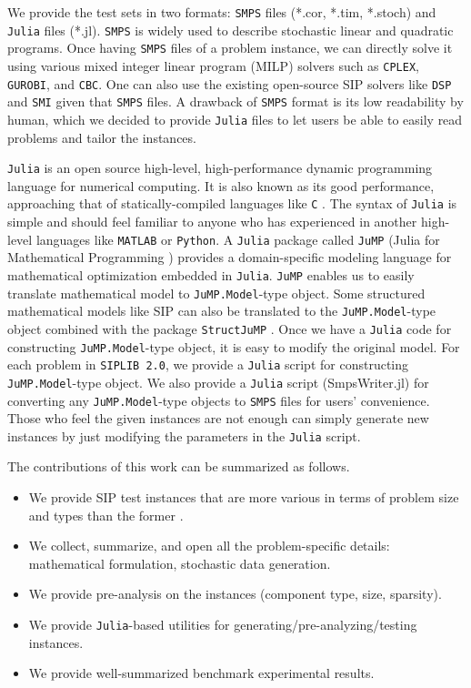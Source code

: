 We provide the test sets in two formats: \texttt{SMPS} files (*.cor, *.tim, *.stoch) and \texttt{Julia} files (*.jl). \texttt{SMPS} is widely used to describe stochastic linear and quadratic programs. Once having \texttt{SMPS} files of a problem instance, we can directly solve it using various mixed integer linear program (MILP) solvers such as \texttt{CPLEX}, \texttt{GUROBI}, and \texttt{CBC}. One can also use the existing open-source SIP solvers like \texttt{DSP} \cite{journal:KZ2015} and \texttt{SMI} \cite{web:SMI} given that \texttt{SMPS} files. A drawback of \texttt{SMPS} format is its low readability by human, which we decided to provide \texttt{Julia} files to let users be able to easily read problems and tailor the instances.

\texttt{Julia} is an open source high-level, high-performance dynamic programming language for numerical computing. It is also known as its good performance, approaching that of statically-compiled languages like \texttt{C} \cite{journal:BEKS2017}. The syntax of \texttt{Julia} is simple and should feel familiar to anyone who has experienced in another high-level languages like \texttt{MATLAB} or \texttt{Python}. A \texttt{Julia} package called \texttt{JuMP} (Julia for Mathematical Programming \cite{web:JuMP}) provides a domain-specific modeling language for mathematical optimization embedded in \texttt{Julia}. \texttt{JuMP} enables us to easily translate mathematical model to \texttt{JuMP.Model}-type object. Some structured mathematical models like SIP can also be translated to the \texttt{JuMP.Model}-type object combined with the package \texttt{StructJuMP} \cite{web:StructJuMP}. Once we have a \texttt{Julia} code for constructing \texttt{JuMP.Model}-type object, it is easy to modify the original model. For each problem in \texttt{SIPLIB 2.0}, we provide a \texttt{Julia} script for constructing \texttt{JuMP.Model}-type object. We also provide a \texttt{Julia} script (SmpsWriter.jl) for converting any \texttt{JuMP.Model}-type objects to \texttt{SMPS} files for users' convenience. Those who feel the given instances are not enough can simply generate new instances by just modifying the parameters in the \texttt{Julia} script.

The contributions of this work can be summarized as follows.
\begin{itemize}
	\item We provide SIP test instances that are more various in terms of problem size and types than the former \siplib.
	\item We collect, summarize, and open all the problem-specific details: mathematical formulation, stochastic data generation.
	\item We provide pre-analysis on the instances (component type, size, sparsity).
	\item We provide \texttt{Julia}-based utilities for generating/pre-analyzing/testing instances.
	\item We provide well-summarized benchmark experimental results.
\end{itemize}

